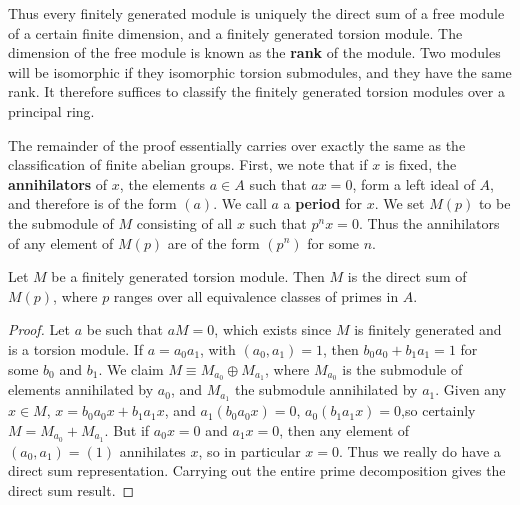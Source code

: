 Thus every finitely generated module is uniquely the direct sum of a free module of a certain finite dimension, and a finitely generated torsion module. The dimension of the free module is known as the {\bf rank} of the module. Two modules will be isomorphic if they isomorphic torsion submodules, and they have the same rank. It therefore suffices to classify the finitely generated torsion modules over a principal ring.

The remainder of the proof essentially carries over exactly the same as the classification of finite abelian groups. First, we note that if $x$ is fixed, the {\bf annihilators} of $x$, the elements $a \in A$ such that $ax = 0$, form a left ideal of $A$, and therefore is of the form $(a)$. We call $a$ a {\bf period} for $x$. We set $M(p)$ to be the submodule of $M$ consisting of all $x$ such that $p^n x = 0$. Thus the annihilators of any element of $M(p)$ are of the form $(p^n)$ for some $n$.

\begin{theorem}
    Let $M$ be a finitely generated torsion module. Then $M$ is the direct sum of $M(p)$, where $p$ ranges over all equivalence classes of primes in $A$.
\end{theorem}
\begin{proof}
    Let $a$ be such that $aM = 0$, which exists since $M$ is finitely generated and is a torsion module. If $a = a_0a_1$, with $(a_0,a_1) = 1$, then $b_0a_0 + b_1a_1 = 1$ for some $b_0$ and $b_1$. We claim $M \equiv M_{a_0} \oplus M_{a_1}$, where $M_{a_0}$ is the submodule of elements annihilated by $a_0$, and $M_{a_1}$ the submodule annihilated by $a_1$. Given any $x \in M$, $x = b_0a_0x + b_1a_1x$, and $a_1(b_0a_0x) = 0$, $a_0(b_1a_1x) = 0$,so certainly $M = M_{a_0} + M_{a_1}$. But if $a_0 x = 0$ and $a_1 x = 0$, then any element of $(a_0,a_1) = (1)$ annihilates $x$, so in particular $x = 0$. Thus we really do have a direct sum representation. Carrying out the entire prime decomposition gives the direct sum result.
\end{proof}

